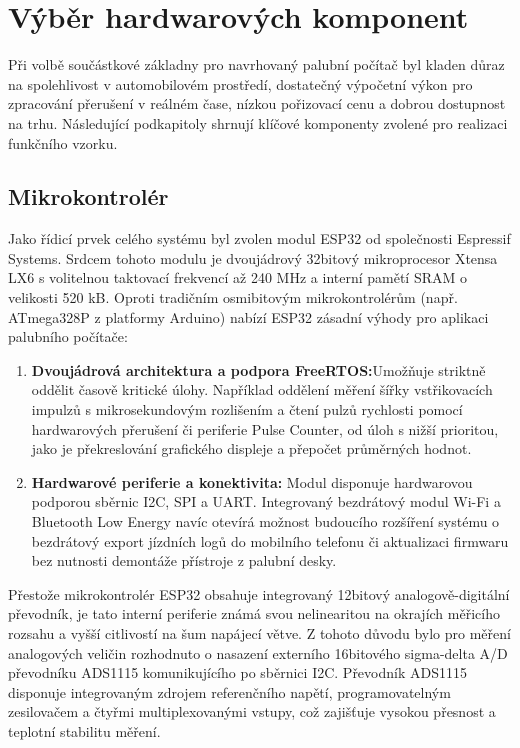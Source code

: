 \chapter{Výběr hardwarových komponent}

Při volbě součástkové základny pro navrhovaný palubní počítač byl kladen důraz na spolehlivost v automobilovém prostředí, 
dostatečný výpočetní výkon pro zpracování přerušení v reálném čase, nízkou pořizovací cenu a dobrou dostupnost na trhu. 
Následující podkapitoly shrnují klíčové komponenty zvolené pro realizaci funkčního vzorku.

\section{Mikrokontrolér}

Jako řídicí prvek celého systému byl zvolen modul ESP32 od společnosti Espressif Systems. 
Srdcem tohoto modulu je dvoujádrový 32bitový mikroprocesor Xtensa LX6 s volitelnou taktovací frekvencí až 240 MHz a interní pamětí SRAM o velikosti 520 kB. 
Oproti tradičním osmibitovým mikrokontrolérům (např. ATmega328P z platformy Arduino) nabízí ESP32 zásadní výhody pro aplikaci palubního počítače:

\begin{enumerate}
    \item \textbf{Dvoujádrová architektura a podpora FreeRTOS:}Umožňuje striktně oddělit časově kritické úlohy. Například oddělení měření šířky vstřikovacích impulzů s 
    mikrosekundovým rozlišením a čtení pulzů rychlosti pomocí hardwarových přerušení či periferie Pulse Counter,
    od úloh s nižší prioritou, jako je překreslování grafického displeje a přepočet průměrných hodnot.
    \item \textbf{Hardwarové periferie a konektivita:} Modul disponuje hardwarovou podporou sběrnic I2C, SPI a UART. 
    Integrovaný bezdrátový modul Wi-Fi a Bluetooth Low Energy navíc otevírá možnost budoucího rozšíření systému o bezdrátový export jízdních logů do mobilního 
    telefonu či aktualizaci firmwaru bez nutnosti demontáže přístroje z palubní desky.
\end{enumerate} 

Přestože mikrokontrolér ESP32 obsahuje integrovaný 12bitový analogově-digitální převodník, 
je tato interní periferie známá svou nelinearitou na okrajích měřicího rozsahu a vyšší citlivostí na šum napájecí větve. 
Z tohoto důvodu bylo pro měření analogových veličin rozhodnuto o nasazení externího 16bitového sigma-delta A/D převodníku ADS1115 komunikujícího po sběrnici I2C. 
Převodník ADS1115 disponuje integrovaným zdrojem referenčního napětí, programovatelným zesilovačem a čtyřmi multiplexovanými vstupy, 
což zajišťuje vysokou přesnost a teplotní stabilitu měření.

